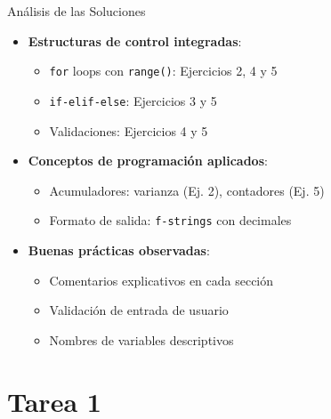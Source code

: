 \documentclass[10pt]{beamer}
\begin{document}
\begin{frame}{Análisis de las Soluciones}
  \begin{itemize}
    \item \textbf{Estructuras de control integradas}:
      \begin{itemize}
        \item \texttt{for} loops con \texttt{range()}: Ejercicios 2, 4 y 5
        \item \texttt{if-elif-else}: Ejercicios 3 y 5
        \item Validaciones: Ejercicios 4 y 5
      \end{itemize}
    \item \textbf{Conceptos de programación aplicados}:
      \begin{itemize}
        \item Acumuladores: varianza (Ej. 2), contadores (Ej. 5)
        \item Formato de salida: \texttt{f-strings} con decimales
      \end{itemize}
    \item \textbf{Buenas prácticas observadas}:
      \begin{itemize}
        \item Comentarios explicativos en cada sección
        \item Validación de entrada de usuario
        \item Nombres de variables descriptivos
      \end{itemize}
  \end{itemize}
\end{frame}



\iffalse
\section{Tarea 1}
\end{document}
